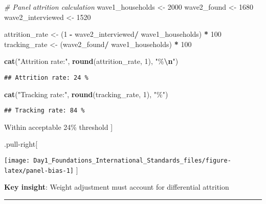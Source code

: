 \documentclass[
]{article}
\newenvironment{Shaded}{\begin{snugshade}}{\end{snugshade}}
\newcommand{\CommentTok}[1]{\textcolor[rgb]{0.56,0.35,0.01}{\textit{#1}}}
\newcommand{\DecValTok}[1]{\textcolor[rgb]{0.00,0.00,0.81}{#1}}
\newcommand{\FunctionTok}[1]{\textcolor[rgb]{0.13,0.29,0.53}{\textbf{#1}}}
\newcommand{\NormalTok}[1]{#1}
\newcommand{\OtherTok}[1]{\textcolor[rgb]{0.56,0.35,0.01}{#1}}
\newcommand{\SpecialCharTok}[1]{\textcolor[rgb]{0.81,0.36,0.00}{\textbf{#1}}}
\newcommand{\StringTok}[1]{\textcolor[rgb]{0.31,0.60,0.02}{#1}}
\begin{document}
\begin{Shaded}
\begin{Highlighting}[]
\CommentTok{\# Panel attrition calculation}
\NormalTok{wave1\_households }\OtherTok{\textless{}{-}} \DecValTok{2000}
\NormalTok{wave2\_found }\OtherTok{\textless{}{-}} \DecValTok{1680}
\NormalTok{wave2\_interviewed }\OtherTok{\textless{}{-}} \DecValTok{1520}

\NormalTok{attrition\_rate }\OtherTok{\textless{}{-}}\NormalTok{ (}\DecValTok{1} \SpecialCharTok{{-}}\NormalTok{ wave2\_interviewed}\SpecialCharTok{/}
\NormalTok{                   wave1\_households) }\SpecialCharTok{*} \DecValTok{100}
\NormalTok{tracking\_rate }\OtherTok{\textless{}{-}}\NormalTok{ (wave2\_found}\SpecialCharTok{/}
\NormalTok{                  wave1\_households) }\SpecialCharTok{*} \DecValTok{100}

\FunctionTok{cat}\NormalTok{(}\StringTok{"Attrition rate:"}\NormalTok{, }\FunctionTok{round}\NormalTok{(attrition\_rate, }\DecValTok{1}\NormalTok{), }\StringTok{"\%}\SpecialCharTok{\textbackslash{}n}\StringTok{"}\NormalTok{)}
\end{Highlighting}
\end{Shaded}

\begin{verbatim}
## Attrition rate: 24 %
\end{verbatim}

\begin{Shaded}
\begin{Highlighting}[]
\FunctionTok{cat}\NormalTok{(}\StringTok{"Tracking rate:"}\NormalTok{, }\FunctionTok{round}\NormalTok{(tracking\_rate, }\DecValTok{1}\NormalTok{), }\StringTok{"\%"}\NormalTok{)}
\end{Highlighting}
\end{Shaded}

\begin{verbatim}
## Tracking rate: 84 %
\end{verbatim}

Within acceptable 24\% threshold {]}

.pull-right{[}

\texttt{[image: Day1\_Foundations\_International\_Standards\_files/figure-latex/panel-bias-1]}
{]}

\textbf{Key insight}: Weight adjustment must account for differential
attrition

\begin{center}\rule{0.5\linewidth}{0.5pt}\end{center}
\end{document}
